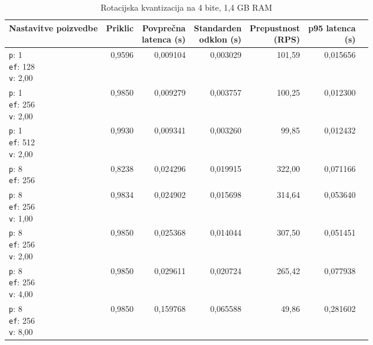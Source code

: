 \begin{table}[htbp]
  \centering
\small
  \caption{Rotacijska kvantizacija na 4 bite, 1,4 GB RAM}
  \label{tab:single-2cpu-1.4ram:tq4:qdrant-dipl-baseline-tenant-subgraph-tq4-ext-m16-ef-128-random-768-100-tenants-extended-upload-2026-08-18-22-25-47.json}
  \begin{tabularx}{\textwidth}{Xrrrrrr}
    \toprule
    Nastavitve poizvedbe & Priklic & \makecell{Povprečna\\latenca (s)} & \makecell{Standarden\\odklon (s)} & \makecell{Prepustnost\\(RPS)} & \makecell{p95 latenca\\(s)}  \\
    \midrule
    \makecell{\texttt{p}: 1\\\texttt{ef}: 128\\\texttt{v}: 2,00} & 0,9596 & 0,009104 & 0,003029 & 101,59 & 0,015656 \\
    \makecell{\texttt{p}: 1\\\texttt{ef}: 256\\\texttt{v}: 2,00} & 0,9850 & 0,009279 & 0,003757 & 100,25 & 0,012300 \\
    \makecell{\texttt{p}: 1\\\texttt{ef}: 512\\\texttt{v}: 2,00} & 0,9930 & 0,009341 & 0,003260 & 99,85 & 0,012432 \\
    \makecell{\texttt{p}: 8\\\texttt{ef}: 256} & 0,8238 & 0,024296 & 0,019915 & 322,00 & 0,071166 \\
    \makecell{\texttt{p}: 8\\\texttt{ef}: 256\\\texttt{v}: 1,00} & 0,9834 & 0,024902 & 0,015698 & 314,64 & 0,053640 \\
    \makecell{\texttt{p}: 8\\\texttt{ef}: 256\\\texttt{v}: 2,00} & 0,9850 & 0,025368 & 0,014044 & 307,50 & 0,051451 \\
    \makecell{\texttt{p}: 8\\\texttt{ef}: 256\\\texttt{v}: 4,00} & 0,9850 & 0,029611 & 0,020724 & 265,42 & 0,077938 \\
    \makecell{\texttt{p}: 8\\\texttt{ef}: 256\\\texttt{v}: 8,00} & 0,9850 & 0,159768 & 0,065588 & 49,86 & 0,281602 \\

\end{tabularx}
\end{table}
